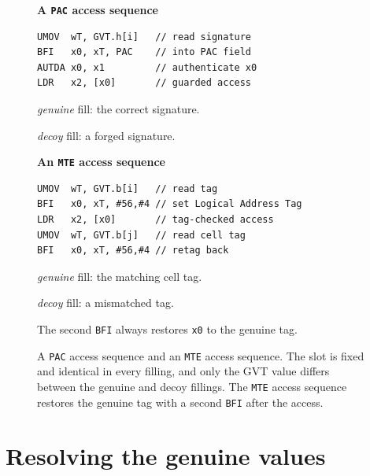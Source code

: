\begin{figure}[t]
\centering
\footnotesize
\begin{minipage}[t]{0.48\linewidth}
\centering\textbf{A \texttt{PAC} access sequence}\par\smallskip
\begin{verbatim}
UMOV  wT, GVT.h[i]   // read signature
BFI   x0, xT, PAC    // into PAC field
AUTDA x0, x1         // authenticate x0
LDR   x2, [x0]       // guarded access
\end{verbatim}
\vspace{\baselineskip}
\raggedright
\emph{genuine} fill: the correct signature.\par
\emph{decoy} fill: a forged signature.
\end{minipage}\hfill
\begin{minipage}[t]{0.48\linewidth}
\centering\textbf{An \texttt{MTE} access sequence}\par\smallskip
\begin{verbatim}
UMOV  wT, GVT.b[i]   // read tag
BFI   x0, xT, #56,#4 // set Logical Address Tag
LDR   x2, [x0]       // tag-checked access
UMOV  wT, GVT.b[j]   // read cell tag
BFI   x0, xT, #56,#4 // retag back
\end{verbatim}
\raggedright
\emph{genuine} fill: the matching cell tag.\par
\emph{decoy} fill: a mismatched tag.\par
The second \texttt{BFI} always restores \texttt{x0} to the genuine tag.
\end{minipage}
\caption{A \texttt{PAC} access sequence and an \texttt{MTE} access sequence. The slot is fixed and identical in
every filling, and only the GVT value differs between the genuine and decoy fillings. The
\texttt{MTE} access sequence restores the genuine tag with a second \texttt{BFI} after the access.}
\label{fig:precond-access}
\end{figure}

\section{Resolving the genuine values}
\label{sec:precond-resolve}

